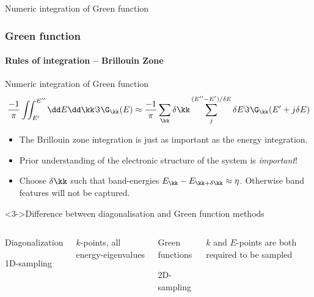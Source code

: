 \begin{frame}[label=integration]
\begin{block}{Numeric integration of Green function}
  \end{block}


\end{frame}


\begin{frame}[label={green.bz}]
  \frametitle{Green function}
  \framesubtitle{Rules of integration -- Brillouin Zone}


  \begin{block}{Numeric integration of Green function}
    \small
    \begin{equation*}
      \frac{-1}\pi\iint_{E'}^{E''} \dd E\dd \kk\Im \G_\kk(E) \approx \frac{-1}\pi
      \sum_\kk\delta\kk\sum_j^{(E''-E')/\delta E} \delta E \Im \G_\kk(E'+j\delta E)
    \end{equation*}

    \begin{itemize}
      \item%
      The Brillouin zone integration is just as important as the energy integration.

      \item%
      Prior understanding of the electronic structure of the system is \emph{important}!

      \item<2->%
      Choose $\delta\kk$ such that band-energies $E_\kk -
      E_{\kk+\delta\kk}\approx \eta$. Otherwise band features will not be captured.

    \end{itemize}

  \end{block}

  \begin{block}<3->{Difference between diagonalisation and Green function methods}

    \begin{columns}[t]

      \begin{center}
        Diagonalization

        \Large 1D-sampling
      \end{center}

      $k$-points, all energy-eigenvalues


      \begin{center}
        Green functions

        \Large 2D-sampling
      \end{center}

      $k$ and $E$-points are both required to be sampled

    \end{columns}

  \end{block}

\end{frame}


